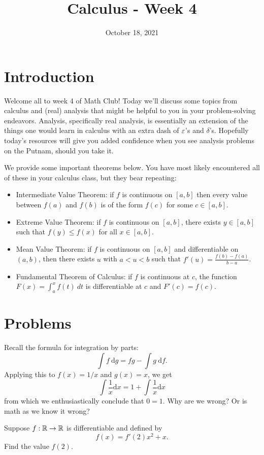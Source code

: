 \documentclass{article}
\title{Calculus - Week 4}
\author{}
\date{October 18, 2021}
\begin{document}
\section{Introduction}

Welcome all to week 4 of Math Club!
Today we'll discuss some topics from calculus and (real) analysis that might be helpful to you in your problem-solving endeavors.
Analysis, specifically real analysis, is essentially an extension of the things one would learn in calculus with an extra dash of \(\varepsilon\)'s and \(\delta\)'s.
Hopefully today's resources will give you added confidence when you see analysis problems on the Putnam, should you take it.

We provide some important theorems below.
You have most likely encountered all of these in your calculus class, but they bear repeating:
\begin{itemize}
    \item Intermediate Value Theorem: if $f$ is continuous on $[a,b]$ then every value between $f(a)$ and $f(b)$ is of the form $f(c) $ for some $c\in [a,b]$.
    \item Extreme Value Theorem: if $f$ is continuous on $[a,b]$, there exists $y\in [a,b]$ such that $f(y)\leq f(x)$ for all $x\in [a,b]$.
    \item Mean Value Theorem: if $f$ is continuous on $[a,b]$ and differentiable on $(a,b)$, then there exists $u$ with $a < u < b$ such that $f'(u)=\frac{f(b)-f(a)}{b-a}$.
    \item Fundamental Theorem of Calculus: if $f$ is continuous at $c$, the function $F(x) = \int_a^x f(t)\ dt$ is differentiable at $c$ and $F'(c)=f(c)$.
\end{itemize}
    

\section{Problems}

\begin{exercise}
Recall the formula for integration by parts:
\[\int f\ \mathrm{d}g = fg - \int g\ \mathrm{d}f.\]
Applying this to \(f(x)=1/x\) and \(g(x)=x\), we get
\[\int\frac{1}{x}\mathrm{d}x = 1 + \int\frac{1}{x}\mathrm{d}x\]
from which we enthusiastically conclude that \(0=1\).
Why are we wrong? Or is math as we know it wrong?
\end{exercise}

\begin{exercise}
Suppose \(f:\mathbb{R}\to\mathbb{R}\) is differentiable and defined by
\[f(x) = f'(2)x^2 + x.\]
Find the value \(f(2)\).
\end{exercise}
\end{document}
